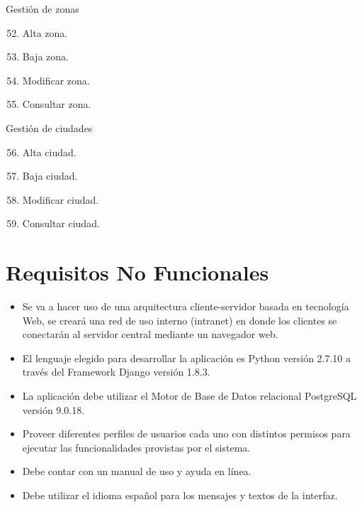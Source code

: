 \documentclass[letterpaper,10pt,english]{sphinxmanual}
\begin{document}
Gestión de zonas
\begin{enumerate}
\setcounter{enumi}{51}
\item {} 
Alta zona.

\item {} 
Baja zona.

\item {} 
Modificar zona.

\item {} 
Consultar zona.

\end{enumerate}

Gestión de ciudades
\begin{enumerate}
\setcounter{enumi}{55}
\item {} 
Alta ciudad.

\item {} 
Baja ciudad.

\item {} 
Modificar ciudad.

\item {} 
Consultar ciudad.

\end{enumerate}


\section{Requisitos No Funcionales}
\label{proyecto:requisitos-no-funcionales}\begin{itemize}
\item {} 
Se va a hacer uso de una arquitectura cliente-servidor basada en tecnología Web, se creará una red de uso interno (intranet) en donde los clientes se conectarán al servidor central mediante un navegador web.

\item {} 
El lenguaje elegido para desarrollar la aplicación es Python versión 2.7.10 a través del Framework Django versión 1.8.3.

\item {} 
La aplicación debe utilizar el Motor de Base de Datos relacional PostgreSQL versión 9.0.18.

\item {} 
Proveer diferentes perfiles de usuarios cada uno con distintos permisos para ejecutar las funcionalidades provistas por el sistema.

\item {} 
Debe contar con un manual de uso y ayuda en línea.

\item {} 
Debe utilizar el idioma español para los mensajes y textos de la interfaz.

\end{itemize}
\end{document}
